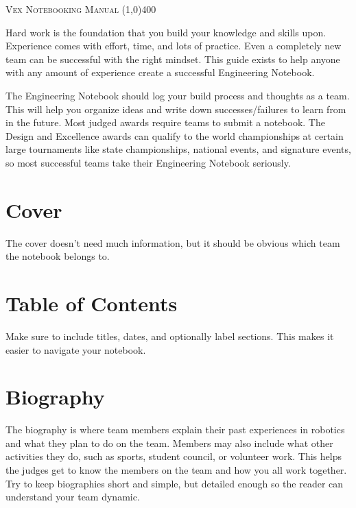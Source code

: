 \documentclass[letterpaper, 12pt]{article}
\begin{document}
\begin{center}
\huge\textsc{Vex Notebooking Manual}
\line(1,0){400}

\vspace{0.1in}

\end{center}

Hard work is the foundation that you build your knowledge and skills upon. Experience comes with effort, time, and lots of practice. Even a completely new team can be successful with the right mindset. This guide exists to help anyone with any amount of experience create a successful Engineering Notebook.

The Engineering Notebook should log your build process and thoughts as a team. This will help you organize ideas and write down successes/failures to learn from in the future. Most judged awards require teams to submit a notebook. The Design and Excellence awards can qualify to the world championships at certain large tournaments like state championships, national events, and signature events, so most successful teams take their Engineering Notebook seriously.

\section*{Cover}

The cover doesn’t need much information, but it should be obvious which team the notebook belongs to.

\section*{Table of Contents}

Make sure to include titles, dates, and optionally label sections. This makes it easier to navigate your notebook.

\section*{Biography}

The biography is where team members explain their past experiences in robotics and what they plan to do on the team. Members may also include what other activities they do, such as sports, student council, or volunteer work. This helps the judges get to know the members on the team and how you all work together. Try to keep biographies short and simple, but detailed enough so the reader can understand your team dynamic.
\end{document}
